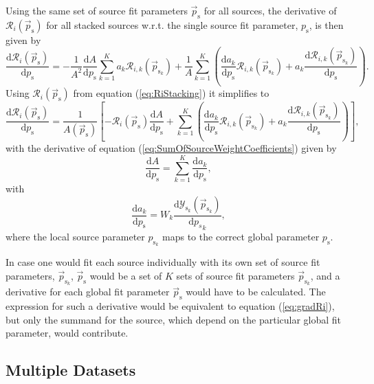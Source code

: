\documentclass{article}
\newcommand{\ps}{\vec{p}_{\mathrm{s}}}
\newcommand{\psk}{\vec{p}_{\mathrm{s}_k}}
\begin{document}
Using the same set of source fit parameters $\ps$ for all sources, the
derivative of $\mathcal{R}_i(\ps)$ for
all stacked sources w.r.t. the single source fit parameter,
$p_{\mathrm{s}}$, is then given by
\begin{equation}
 \frac{\mathrm{d} \mathcal{R}_{i}(\ps)}{\mathrm{d} p_{\mathrm{s}}} = - \frac{1}{A^2} \frac{\mathrm{d} A}{\mathrm{d} p_{\mathrm{s}}} \sum_{k=1}^{K} a_{k} \mathcal{R}_{i,k}(\psk) + \frac{1}{A}\sum_{k=1}^{K} \left( \frac{\mathrm{d} a_{k}}{\mathrm{d} p_{\mathrm{s}}}\mathcal{R}_{i,k}(\psk) + a_{k}\frac{\mathrm{d} \mathcal{R}_{i,k}(\psk)}{\mathrm{d} p_{\mathrm{s}}} \right).
\end{equation}
Using $\mathcal{R}_i(\ps)$ from equation (\ref{eq:RiStacking}) it simplifies to
\begin{equation}
 \frac{\mathrm{d} \mathcal{R}_{i}(\ps)}{\mathrm{d} p_{\mathrm{s}}} = \frac{1}{A(\ps)}\left[ -\mathcal{R}_i(\ps)\frac{\mathrm{d} A}{\mathrm{d} p_{\mathrm{s}}} + \sum_{k=1}^{K} \left( \frac{\mathrm{d} a_{k}}{\mathrm{d} p_{\mathrm{s}}}\mathcal{R}_{i,k}(\psk) + a_{k}\frac{\mathrm{d} \mathcal{R}_{i,k}(\psk)}{\mathrm{d} p_{\mathrm{s}}} \right) \right],
 \label{eq:gradRi}
\end{equation}
with the derivative of equation (\ref{eq:SumOfSourceWeightCoefficients}) given by
\begin{equation}
 \frac{\mathrm{d} A}{\mathrm{d} p_{\mathrm{s}}} = \sum_{k=1}^{K} \frac{\mathrm{d} a_k}{\mathrm{d} p_{\mathrm{s}}},
\end{equation}
with
\begin{equation}
\frac{\mathrm{d} a_k}{\mathrm{d} p_{\mathrm{s}}} = W_k \frac{\mathrm{d}\mathcal{Y}_{\mathrm{s}_{k}}(\psk)}{\mathrm{d}{p_s}_k},
\end{equation}
where the local source parameter $p_{\mathrm{s}_{k}}$ maps to the correct global
parameter $p_{\mathrm{s}}$.

In case one would fit each source individually with its own set of source fit
parameters, $\psk$, $\ps$ would be a set of $K$ sets
of source fit parameters $\psk$, and a derivative for each
global fit parameter $\ps$ would have to be calculated.
The expression for such a derivative would be equivalent to equation
(\ref{eq:gradRi}), but only the summand for the source, which depend on the
particular global fit parameter, would contribute.


\subsection{Multiple Datasets}
\end{document}
